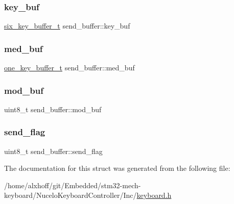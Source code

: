 \subsubsection{\texorpdfstring{key\+\_\+buf}{key\_buf}}
{\footnotesize\ttfamily \hyperlink{keyboard_8h_ade7751d5843483b986b63a84a5ea6963}{six\+\_\+key\+\_\+buffer\+\_\+t} send\+\_\+buffer\+::key\+\_\+buf}

\mbox{\label{structsend__buffer_a50a00b397fd66c2f36dc607e82a51daf}} 
\subsubsection{\texorpdfstring{med\+\_\+buf}{med\_buf}}
{\footnotesize\ttfamily \hyperlink{keyboard_8h_aba6323f912601b5a724db813a53fdcfe}{one\+\_\+key\+\_\+buffer\+\_\+t} send\+\_\+buffer\+::med\+\_\+buf}

\mbox{\label{structsend__buffer_a1ed1ea0b6d0ffbe2af4f8aff77cd5d56}} 
\subsubsection{\texorpdfstring{mod\+\_\+buf}{mod\_buf}}
{\footnotesize\ttfamily uint8\+\_\+t send\+\_\+buffer\+::mod\+\_\+buf}

\mbox{\label{structsend__buffer_a2584076f9d2f17205d4625411b0d5808}} 
\subsubsection{\texorpdfstring{send\+\_\+flag}{send\_flag}}
{\footnotesize\ttfamily uint8\+\_\+t send\+\_\+buffer\+::send\+\_\+flag}



The documentation for this struct was generated from the following file\+:\begin{DoxyCompactItemize}
\item 
/home/alxhoff/git/\+Embedded/stm32-\/mech-\/keyboard/\+Nucelo\+Keyboard\+Controller/\+Inc/\hyperlink{keyboard_8h}{keyboard.\+h}\end{DoxyCompactItemize}
